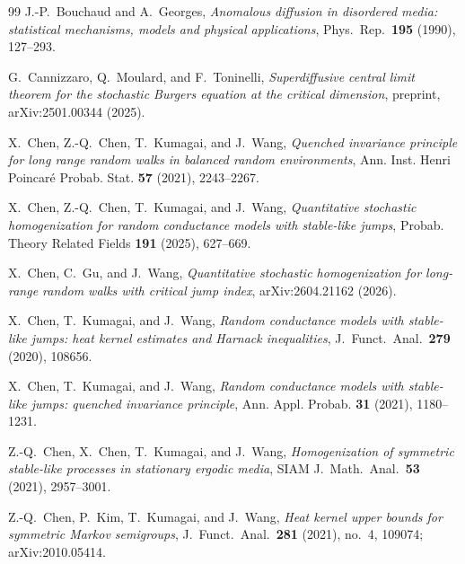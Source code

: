 \documentclass[11pt]{amsart}
\numberwithin{equation}{section}
\begin{document}
\begin{thebibliography}{99}
J.-P.~Bouchaud and A.~Georges,
\emph{Anomalous diffusion in disordered media: statistical mechanisms, models and physical applications},
Phys.\ Rep.\ \textbf{195} (1990), 127--293.

G.~Cannizzaro, Q.~Moulard, and F.~Toninelli,
\emph{Superdiffusive central limit theorem for the stochastic Burgers equation at the critical dimension},
preprint, arXiv:2501.00344 (2025).

X.~Chen, Z.-Q.~Chen, T.~Kumagai, and J.~Wang,
\emph{Quenched invariance principle for long range random walks in balanced random environments},
Ann. Inst. Henri Poincar\'e Probab. Stat. \textbf{57} (2021), 2243--2267.

X.~Chen, Z.-Q.~Chen, T.~Kumagai, and J.~Wang,
\emph{Quantitative stochastic homogenization for random conductance models with stable-like jumps},
Probab. Theory Related Fields \textbf{191} (2025), 627--669.

X.~Chen, C.~Gu, and J.~Wang,
\emph{Quantitative stochastic homogenization for long-range random walks with critical jump index},
arXiv:2604.21162 (2026).

X.~Chen, T.~Kumagai, and J.~Wang,
\emph{Random conductance models with stable-like jumps: heat kernel estimates and Harnack inequalities},
J.\ Funct.\ Anal.\ \textbf{279} (2020), 108656.

X.~Chen, T.~Kumagai, and J.~Wang,
\emph{Random conductance models with stable-like jumps: quenched invariance principle},
Ann. Appl. Probab. \textbf{31} (2021), 1180--1231.

Z.-Q.~Chen, X.~Chen, T.~Kumagai, and J.~Wang,
\emph{Homogenization of symmetric stable-like processes in stationary ergodic media},
SIAM J.\ Math.\ Anal.\ \textbf{53} (2021), 2957--3001.

Z.-Q.~Chen, P.~Kim, T.~Kumagai, and J.~Wang,
\emph{Heat kernel upper bounds for symmetric Markov semigroups},
J.\ Funct.\ Anal.\ \textbf{281} (2021), no.~4, 109074; arXiv:2010.05414.


\end{thebibliography}
\end{document}
